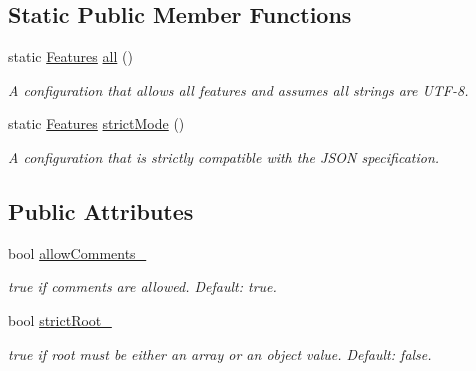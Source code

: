 \subsection*{Static Public Member Functions}
\begin{DoxyCompactItemize}
\item 
static \hyperlink{protocol_json_1_1_j_s_o_n___a_p_i_ad689444ef42491b89324975696f0ed58}{Features} \hyperlink{protocol_json_1_1_j_s_o_n___a_p_i_a597c6015488c43c485760edda8cfdf5c}{all} ()
\begin{DoxyCompactList}\small\item\em A configuration that allows all features and assumes all strings are U\-T\-F-\/8. \end{DoxyCompactList}\item 
static \hyperlink{protocol_json_1_1_j_s_o_n___a_p_i_ad689444ef42491b89324975696f0ed58}{Features} \hyperlink{protocol_json_1_1_j_s_o_n___a_p_i_af354da64e0f08333590de851180e1b41}{strict\-Mode} ()
\begin{DoxyCompactList}\small\item\em A configuration that is strictly compatible with the J\-S\-O\-N specification. \end{DoxyCompactList}\end{DoxyCompactItemize}
\subsection*{Public Attributes}
\begin{DoxyCompactItemize}
\item 
\hypertarget{protocol_json_1_1_j_s_o_n___a_p_i_a647b2843efe8a0a69353ab915527eafe}{bool \hyperlink{protocol_json_1_1_j_s_o_n___a_p_i_a647b2843efe8a0a69353ab915527eafe}{allow\-Comments\-\_\-}}\label{protocol_json_1_1_j_s_o_n___a_p_i_a647b2843efe8a0a69353ab915527eafe}

\begin{DoxyCompactList}\small\item\em {\ttfamily true} if comments are allowed. Default\-: {\ttfamily true}. \end{DoxyCompactList}\item 
\hypertarget{protocol_json_1_1_j_s_o_n___a_p_i_a309a273d34b98d60ba6479343f4974e3}{bool \hyperlink{protocol_json_1_1_j_s_o_n___a_p_i_a309a273d34b98d60ba6479343f4974e3}{strict\-Root\-\_\-}}\label{protocol_json_1_1_j_s_o_n___a_p_i_a309a273d34b98d60ba6479343f4974e3}

\begin{DoxyCompactList}\small\item\em {\ttfamily true} if root must be either an array or an object value. Default\-: {\ttfamily false}. \end{DoxyCompactList}\end{DoxyCompactItemize}
